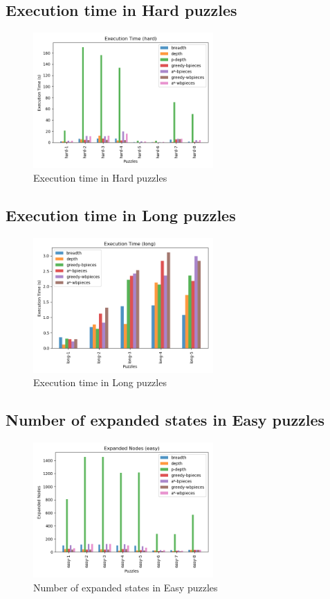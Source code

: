 \documentclass[conference]{IEEEtran}
\begin{document}
\subsection{Execution time in Hard puzzles}
\begin{figure}[H]
    \centerline{\includegraphics[width=260px]{../../graphics/executionTime-hard.png}}
    \caption{Execution time in Hard puzzles}
\end{figure}

\subsection{Execution time in Long puzzles}
\begin{figure}[H]
    \centerline{\includegraphics[width=260px]{../../graphics/executionTime-long.png}}
    \caption{Execution time in Long puzzles}
\end{figure}

\subsection{Number of expanded states in Easy puzzles}
\begin{figure}[H]
    \centerline{\includegraphics[width=260px]{../../graphics/expandedNodes-easy.png}}
    \caption{Number of expanded states in Easy puzzles}
\end{figure}
\end{document}
